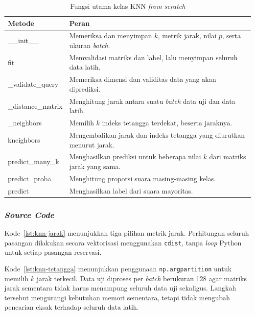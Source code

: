 \begin{table}[H]
 \centering
 \caption{Fungsi utama kelas KNN \textit{from scratch}}
 \label{tab:knn-fungsi}
 \begin{tabularx}{\textwidth}{>{\ttfamily\footnotesize}l Y}
  \toprule
  \textnormal{\textbf{Metode}} & \textbf{Peran} \\
  \midrule
  \_\_init\_\_ & Memeriksa dan menyimpan $k$, metrik jarak, nilai $p$, serta ukuran \textit{batch}. \\
  fit & Memvalidasi matriks dan label, lalu menyimpan seluruh data latih. \\
  \_validate\_query & Memeriksa dimensi dan validitas data yang akan diprediksi. \\
  \_distance\_matrix & Menghitung jarak antara suatu \textit{batch} data uji dan data latih. \\
  \_neighbors & Memilih $k$ indeks tetangga terdekat, beserta jaraknya. \\
  kneighbors & Mengembalikan jarak dan indeks tetangga yang diurutkan menurut jarak. \\
  predict\_many\_k & Menghasilkan prediksi untuk beberapa nilai $k$ dari matriks jarak yang sama. \\
  predict\_proba & Menghitung proporsi suara masing-masing kelas. \\
  predict & Menghasilkan label dari suara mayoritas. \\
  \bottomrule
 \end{tabularx}
\end{table}

\subsubsection{\textit{Source Code}}
Kode~\ref{lst:knn-jarak} menunjukkan tiga pilihan metrik jarak. Perhitungan seluruh pasangan dilakukan secara vektorisasi menggunakan \texttt{cdist}, tanpa \textit{loop} Python untuk setiap pasangan reservasi.


Kode~\ref{lst:knn-tetangga} menunjukkan penggunaan \texttt{np.argpartition} untuk memilih $k$ jarak terkecil. Data uji diproses per \textit{batch} berukuran 128 agar matriks jarak sementara tidak harus menampung seluruh data uji sekaligus. Langkah tersebut mengurangi kebutuhan memori sementara, tetapi tidak mengubah pencarian eksak terhadap seluruh data latih.

